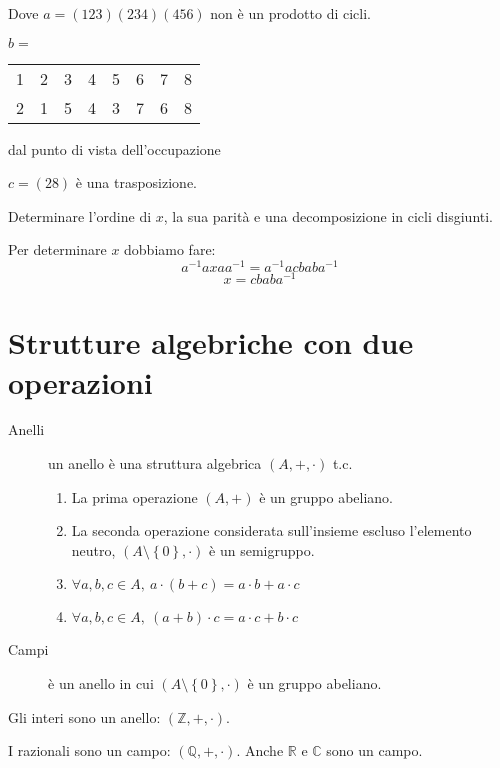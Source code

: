 Dove $a = (1 2 3) (2 3 4) (4 5 6)$
non \`e un prodotto di cicli.

$b = $

\begin{tabular}{*{8}{c}}
1 & 2 & 3 & 4 & 5 & 6 & 7 & 8 \\
2 & 1 & 5 & 4 & 3 & 7 & 6 & 8
\end{tabular}

dal punto di vista dell'occupazione

$c = (2 8)$
\`e una trasposizione.

Determinare l'ordine di $x$, la sua parit\`a e una decomposizione in cicli disgiunti.

Per determinare $x$ dobbiamo fare:
\[
a^{-1} a x a a^{-1} = a^{-1} a c b a b a^{-1}
\]
\[
x = c b a b a^{-1}
\]


\section{Strutture algebriche con due operazioni}

\begin{description}
    \item[Anelli] un anello \`e una struttura algebrica $(A, +, \cdot)$ t.c. 
    \begin{enumerate}
        \item La prima operazione $\left( A, + \right )$ \`e un gruppo abeliano.
        \item La seconda operazione considerata sull'insieme escluso l'elemento neutro, $(A \setminus \left \{ 0 \right \}, \cdot )$ \`e un semigruppo.
        \item $ \forall a, b, c \in A , \ a \cdot (b + c) = a \cdot b + a \cdot c $
        \item $ \forall a, b, c \in A , \ (a + b) \cdot c = a \cdot c + b \cdot c $
    \end{enumerate}
    \item[Campi] \`e un anello in cui $( A \setminus \left \{ 0 \right \}, \cdot )$ \`e un gruppo abeliano.
\end{description}

Gli interi sono un anello: $\left ( \mathbb{Z}, +, \cdot \right )$.

I razionali sono un campo: $\left ( \mathbb{Q}, +, \cdot \right )$. Anche $\mathbb{R}$ e $\mathbb{C}$ sono un campo.


